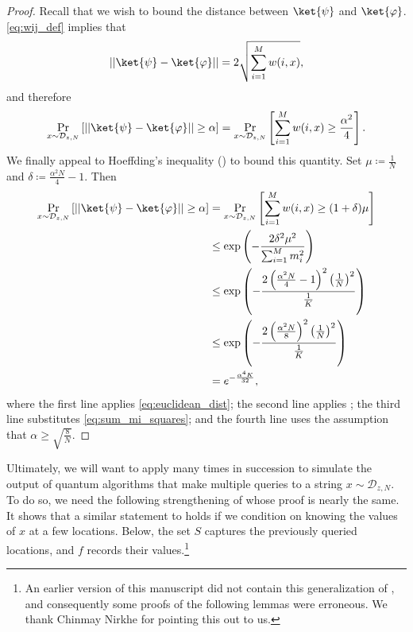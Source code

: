 \documentclass[10pt,a4paper]{article}
\begin{document}
\begin{proof}
Recall that we wish to bound the distance between $\ket{\psi}$ and $\ket{\varphi}$. \eqref{eq:wij_def} implies that
\begin{equation}
|| \ket{\psi} - \ket{\varphi}|| = 2\sqrt{\sum_{i=1}^M w(i,x)},
\label{eq:euclidean_dist}
\end{equation}
and therefore
\[
\Pr_{x \sim \mathcal{D}_{z,N}} \left[|| \ket{\psi} - \ket{\varphi}|| \ge \alpha \right]
= \Pr_{x \sim \mathcal{D}_{z,N}} \left[\sum_{i=1}^M w(i,x) \ge \frac{\alpha^2}{4} \right].
\]
We finally appeal to Hoeffding's inequality () to bound this quantity. Set $\mu \coloneqq \frac{1}{N}$ and $\delta \coloneqq \frac{\alpha^2 N}{4} - 1$. Then
\begin{align*}
\Pr_{x \sim \mathcal{D}_{z,N}} \left[|| \ket{\psi} - \ket{\varphi}|| \ge \alpha \right]
&= \Pr_{x \sim \mathcal{D}_{z,N}} \left[\sum_{i=1}^M w(i,x) \ge (1 + \delta)\mu \right]\\
&\le \exp\left(-\frac{2\delta^2 \mu^2}{\sum_{i=1}^M m_i^2} \right)\\
&\le \exp\left(-\frac{2\left(\frac{\alpha^2N}{4} - 1\right)^2 \left(\frac{1}{N}\right)^2}{\frac{1}{K}} \right)\\
&\le \exp\left(-\frac{2\left(\frac{\alpha^2N}{8}\right)^2 \left(\frac{1}{N}\right)^2}{\frac{1}{K}} \right)\\
&= e^{-\frac{\alpha^4 K}{32}},
\end{align*}
where the first line applies \eqref{eq:euclidean_dist}; the second line applies ; the third line substitutes \eqref{eq:sum_mi_squares}; and the fourth line uses the assumption that $\alpha \ge \sqrt{\frac{8}{N}}$.
\end{proof}

Ultimately, we will want to apply  many times in succession to simulate the output of quantum algorithms that make multiple queries to a string $x \sim \mathcal{D}_{z, N}$. To do so, we need the following strengthening of  whose proof is nearly the same. It shows that a similar statement to  holds if we condition on knowing the values of $x$ at a few locations. Below, the set $S$ captures the previously queried locations, and $f$ records their values.\footnote{An earlier version of this manuscript did not contain this generalization of , and consequently some proofs of the following lemmas were erroneous. We thank Chinmay Nirkhe for pointing this out to us.}
\end{document}
